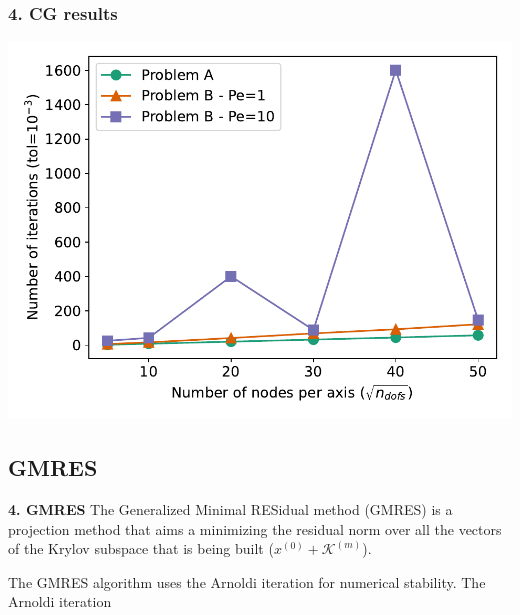\begin{frame}
	\frametitle{\textbf{4. CG results}}
\centering
\includegraphics[width=0.95\linewidth]{images/cg_its}
\end{frame}

\subsection{GMRES}

\begin{frame}[fragile]{\textbf{4. GMRES}}
	The Generalized Minimal RESidual method (GMRES) is a projection method that aims a minimizing the residual norm over all the vectors of the Krylov subspace that is being built ($x^{(0)}+\mathcal{K}^{(m)}$).
	
	
	The GMRES algorithm uses the Arnoldi iteration for numerical stability. The Arnoldi iteration
%	
%	
	\vspace{0.5cm}
	
\end{frame}

